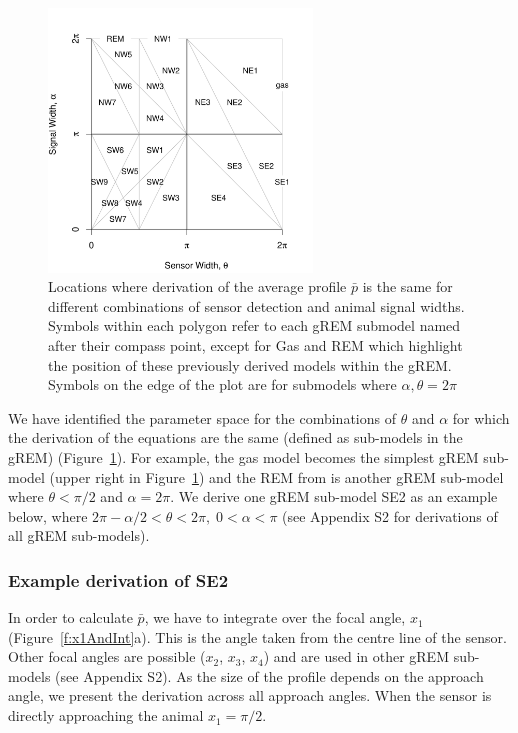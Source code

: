 \documentclass[a4paper,10pt,reqno,oneside]{amsart}
\begin{document}
\begin{figure}
\centering
\includegraphics[width=7cm]{imgs/equalRegions.pdf}
\caption{Locations where derivation of the average profile $\bar{p}$ is the same for different combinations of sensor detection and animal signal widths. Symbols within each polygon refer to each gREM submodel named after their compass point, except for Gas and REM which highlight the position of these previously derived models within the gREM. Symbols on the edge of the plot are for submodels where $\alpha, \theta = 2\pi$}
\label{f:equalRegions}
\end{figure}

We have identified the parameter space for the combinations of $\theta$ and $\alpha$ for which the derivation of the equations are the same (defined as sub-models in the gREM) (Figure~\ref{f:equalRegions}). For example, the gas model becomes the simplest gREM sub-model (upper right in Figure~\ref{f:equalRegions}) and the REM from \citet{rowcliffe2008estimating} is another gREM sub-model where $\theta<\pi/2$ and $\alpha = 2\pi$. We derive one gREM sub-model SE2 as an example below, where $2 \pi - \alpha/2 < \theta < 2\pi ,\; 0 < \alpha <\pi$ (see Appendix S2 for derivations of all gREM sub-models).

\subsubsection*{Example derivation of SE2}

In order to calculate $\bar{p}$, we have to integrate over the focal angle, $x_1$ (Figure~\ref{f:x1AndInt}a). This is the angle taken from the centre line of the sensor. Other focal angles are possible ($x_2$, $x_3$, $x_4$) and are used in other gREM sub-models (see Appendix S2). As the size of the profile depends on the approach angle, we present the derivation across all approach angles. When the sensor is directly approaching the animal $x_1  = \pi/2$.
\end{document}
